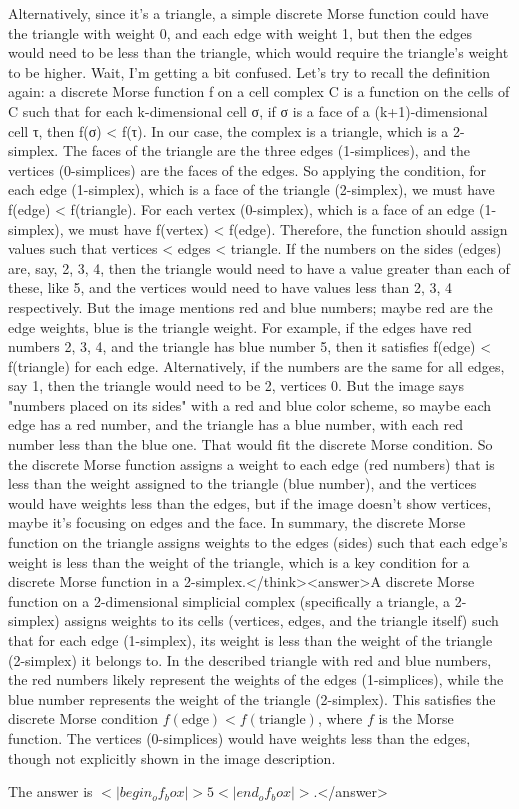 Alternatively, since it's a triangle, a simple discrete Morse function could have the triangle with weight 0, and each edge with weight 1, but then the edges would need to be less than the triangle, which would require the triangle's weight to be higher. Wait, I'm getting a bit confused. Let's try to recall the definition again: a discrete Morse function f on a cell complex C is a function on the cells of C such that for each k-dimensional cell σ, if σ is a face of a (k+1)-dimensional cell τ, then f(σ) < f(τ). In our case, the complex is a triangle, which is a 2-simplex. The faces of the triangle are the three edges (1-simplices), and the vertices (0-simplices) are the faces of the edges. So applying the condition, for each edge (1-simplex), which is a face of the triangle (2-simplex), we must have f(edge) < f(triangle). For each vertex (0-simplex), which is a face of an edge (1-simplex), we must have f(vertex) < f(edge). Therefore, the function should assign values such that vertices < edges < triangle. If the numbers on the sides (edges) are, say, 2, 3, 4, then the triangle would need to have a value greater than each of these, like 5, and the vertices would need to have values less than 2, 3, 4 respectively. But the image mentions red and blue numbers; maybe red are the edge weights, blue is the triangle weight. For example, if the edges have red numbers 2, 3, 4, and the triangle has blue number 5, then it satisfies f(edge) < f(triangle) for each edge. Alternatively, if the numbers are the same for all edges, say 1, then the triangle would need to be 2, vertices 0. But the image says "numbers placed on its sides" with a red and blue color scheme, so maybe each edge has a red number, and the triangle has a blue number, with each red number less than the blue one. That would fit the discrete Morse condition. So the discrete Morse function assigns a weight to each edge (red numbers) that is less than the weight assigned to the triangle (blue number), and the vertices would have weights less than the edges, but if the image doesn't show vertices, maybe it's focusing on edges and the face. In summary, the discrete Morse function on the triangle assigns weights to the edges (sides) such that each edge's weight is less than the weight of the triangle, which is a key condition for a discrete Morse function in a 2-simplex.</think><answer>A discrete Morse function on a 2-dimensional simplicial complex (specifically a triangle, a 2-simplex) assigns weights to its cells (vertices, edges, and the triangle itself) such that for each edge (1-simplex), its weight is less than the weight of the triangle (2-simplex) it belongs to. In the described triangle with red and blue numbers, the red numbers likely represent the weights of the edges (1-simplices), while the blue number represents the weight of the triangle (2-simplex). This satisfies the discrete Morse condition \( f(\text{edge}) < f(\text{triangle}) \), where \( f \) is the Morse function. The vertices (0-simplices) would have weights less than the edges, though not explicitly shown in the image description.  

The answer is \(<|begin_of_box|>5<|end_of_box|>\).</answer>